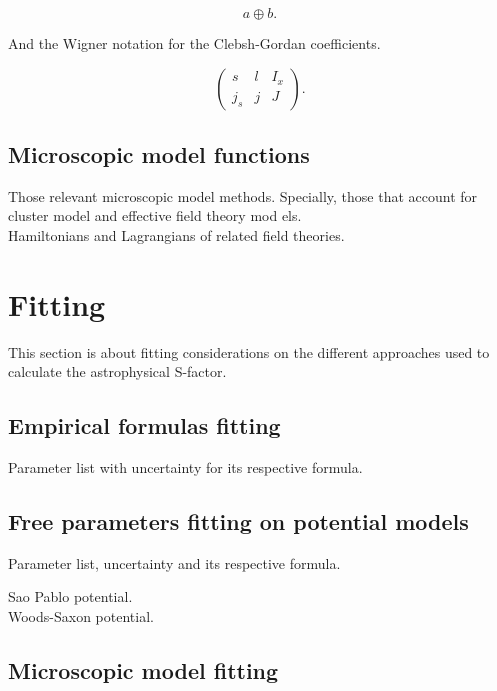 \documentclass[openany]{book}
\begin{document}
\begin{equation}
	a \oplus b.
\end{equation}

And the Wigner notation for the Clebsh-Gordan coefficients.

\begin{equation}
	\left(\begin{array}{ccc}
		s &	l &	I_x \\
		j_s & j & J
	\end{array}\right).
\end{equation}

\section{Microscopic model functions} \label{sec:microscopicalFunctions}

Those relevant microscopic model methods. Specially, those that account for cluster model and effective field theory mod	els. \\

Hamiltonians and Lagrangians of related field theories.

\chapter{Fitting} \label{ap:fitting}

This section is about fitting considerations on the different approaches used to calculate the astrophysical S-factor.

\section{Empirical formulas fitting} \label{sec:empiricalFitting}

Parameter list with uncertainty for its respective formula. 

\section{Free parameters fitting on potential models} \label{sec:potentialFitting}

Parameter list, uncertainty and its respective formula.

\cite{chamon_carlson_gasques_2021} Sao Pablo potential. \\

\cite{diaz-torres_2018} Woods-Saxon potential.

\section{Microscopic model fitting} \label{sec:microscopicFitting}
\end{document}
